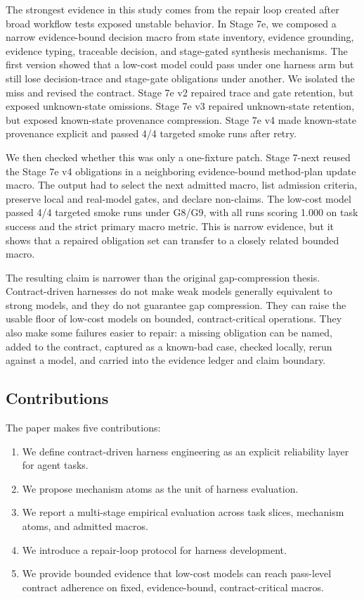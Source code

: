 \documentclass[11pt]{article}
\begin{document}
The strongest evidence in this study comes from the repair loop created after broad workflow tests exposed unstable behavior. In Stage 7e, we composed a narrow evidence-bound decision macro from state inventory, evidence grounding, evidence typing, traceable decision, and stage-gated synthesis mechanisms. The first version showed that a low-cost model could pass under one harness arm but still lose decision-trace and stage-gate obligations under another. We isolated the miss and revised the contract. Stage 7e v2 repaired trace and gate retention, but exposed unknown-state omissions. Stage 7e v3 repaired unknown-state retention, but exposed known-state provenance compression. Stage 7e v4 made known-state provenance explicit and passed 4/4 targeted smoke runs after retry.

We then checked whether this was only a one-fixture patch. Stage 7-next reused the Stage 7e v4 obligations in a neighboring evidence-bound method-plan update macro. The output had to select the next admitted macro, list admission criteria, preserve local and real-model gates, and declare non-claims. The low-cost model passed 4/4 targeted smoke runs under G8/G9, with all runs scoring 1.000 on task success and the strict primary macro metric. This is narrow evidence, but it shows that a repaired obligation set can transfer to a closely related bounded macro.

The resulting claim is narrower than the original gap-compression thesis. Contract-driven harnesses do not make weak models generally equivalent to strong models, and they do not guarantee gap compression. They can raise the usable floor of low-cost models on bounded, contract-critical operations. They also make some failures easier to repair: a missing obligation can be named, added to the contract, captured as a known-bad case, checked locally, rerun against a model, and carried into the evidence ledger and claim boundary.

\subsection{Contributions}

The paper makes five contributions:

\begin{enumerate}
\item We define contract-driven harness engineering as an explicit reliability layer for agent tasks.
\item We propose mechanism atoms as the unit of harness evaluation.
\item We report a multi-stage empirical evaluation across task slices, mechanism atoms, and admitted macros.
\item We introduce a repair-loop protocol for harness development.
\item We provide bounded evidence that low-cost models can reach pass-level contract adherence on fixed, evidence-bound, contract-critical macros.
\end{enumerate}
\end{document}
